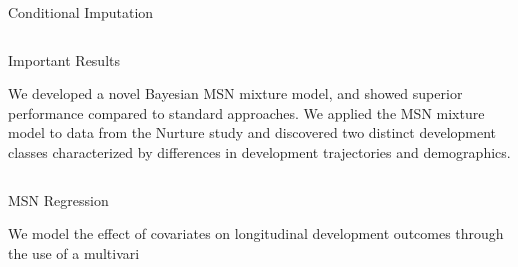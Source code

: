 \documentclass[final]{beamer}
\newlength{\onecolwid}
\newlength{\twocolwid}
\begin{document}
\begin{frame}[t]
\begin{columns}[t]
\begin{column}{\twocolwid}
\begin{columns}[t,totalwidth=\twocolwid]
\begin{column}{\onecolwid}
\begin{block}{Conditional Imputation}



\end{block}


\end{column} %

\end{columns} %


\begin{alertblock}{Important Results}

We developed a novel Bayesian MSN mixture model, and showed superior performance compared to standard approaches. We applied the MSN mixture model to data from the Nurture study and discovered two distinct development classes characterized by differences in development trajectories and demographics.

\end{alertblock} 


\begin{columns}[t,totalwidth=\twocolwid] %

\begin{column}{\onecolwid} %


\begin{block}{MSN Regression}

We model the effect of covariates on longitudinal development outcomes through the use of a multivari 

\end{block}



\end{column}
\end{columns}
\end{column}
\end{columns}
\end{frame}
\end{document}
